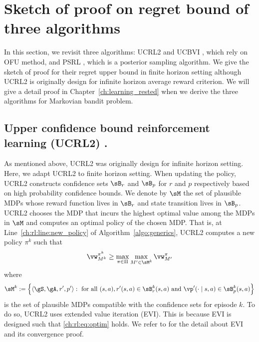 \section{Sketch of proof on regret bound of three algorithms}

In this section, we revisit three algorithms: UCRL2 \cite{jaksch2010near} and UCBVI \cite{azar2017minimax}, which rely on OFU method, and PSRL \cite{osband2013more}, which is a posterior sampling algorithm.
We give the sketch of proof for their regret upper bound in finite horizon setting although UCRL2 is originally design for infinite horizon average reward criterion.
We will give a detail proof in Chapter~\ref{ch:learning_rested} when we derive the three algorithms for Markovian bandit problem.

\subsection{Upper confidence bound reinforcement learning (UCRL2) \texorpdfstring{\cite{jaksch2010near}}{[JOA10]}.}
As mentioned above, UCRL2 was originally design for infinite horizon setting.
Here, we adapt UCRL2 to finite horizon setting.
When updating the policy, UCRL2 constructs confidence sets $\sB_r$ and $\sB_p$ for $r$ and $p$ respectively based on high probability confidence bounds.
We denote by $\sM$ the set of plausible MDPs whose reward function lives in $\sB_r$ and state transition lives in $\sB_p$.
UCRL2 chooses the MDP that incurs the highest optimal value among the MDPs in $\sM$ and computes an optimal policy of the chosen MDP.
That is, at Line~\ref{ch:rl:line:new_policy} of Algorithm~\ref{algo:generics}, UCRL2 computes a new policy $\pi^k$ such that
\begin{equation}
    \label{ch:rl:eq:optim}
    \vw_{M^k}^{\pi^k} \ge \max_{\pi\in\Pi}\max_{M'\in\sM^k} \vw_{M'}^\pi
\end{equation}
where
\begin{align*}
    \sM^k:=\Big\{\langle\gS,\gA,r',p'\rangle :
    \text{ for all }(s,a), r'(s,a)\in\sB_r^k(s,a) \text{ and } \vp'(\cdot\mid s,a)\in\sB_p^k(s,a)\Big\}
\end{align*}
is the set of plausible MDPs compatible with the confidence sets for episode $k$.
To do so, UCRL2 uses extended value iteration (EVI).
This is because EVI is designed such that \eqref{ch:rl:eq:optim} holds.
We refer to \cite{jaksch2010near} for the detail about EVI and its convergence proof.

